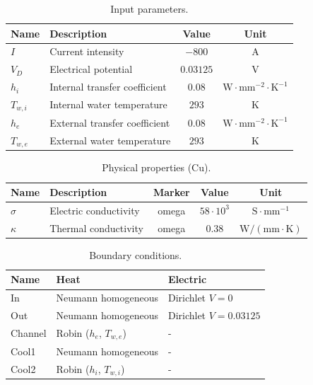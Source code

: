 \documentclass[12pt]{article}
\begin{document}
\begin{table}[H]
	\centering
	\begin{tabular}{|l|l|c|c|}
	\hline
	\textbf{Name} & \textbf{Description} & \textbf{Value} & \textbf{Unit} \\ \hline
	$I$ & Current intensity & $-800$ & A \\ \hline
	$V_D$ & Electrical potential & $0.03125$ & V \\ \hline
	$h_i$ & Internal transfer coefficient & $0.08$ & $\mathrm{W \cdot mm^{-2} \cdot K^{-1}}$ \\ \hline
	$T_{w,i}$ & Internal water temperature & $293$ & K \\ \hline
	$h_e$ & External transfer coefficient & $0.08$ & $\mathrm{W \cdot mm^{-2} \cdot K^{-1}}$ \\ \hline
	$T_{w,e}$ & External water temperature & $293$ & K \\ \hline
	\end{tabular}
	\caption{Input parameters.}
	\label{tab:input_parameters}
	\end{table}

	\begin{table}[H]
		\centering
		\begin{tabular}{|l|l|c|c|c|}
		\hline
		\textbf{Name} & \textbf{Description} & \textbf{Marker} & \textbf{Value} & \textbf{Unit} \\ \hline
		$\sigma$ & Electric conductivity & omega & $58 \cdot 10^3$ & $\mathrm{S \cdot mm^{-1}}$ \\ \hline
		$\kappa$ & Thermal conductivity & omega & $0.38$ & $\mathrm{W/(mm \cdot K)}$ \\ \hline
		\end{tabular}
		\caption{Physical properties (Cu).}
		\label{tab:physical_properties}
	\end{table}

		\begin{table}[H]
			\centering
			\begin{tabular}{|l|l|l|}
			\hline
			\textbf{Name} & \textbf{Heat} & \textbf{Electric} \\ \hline
			In & Neumann homogeneous & Dirichlet $V = 0$ \\ \hline
			Out & Neumann homogeneous & Dirichlet $V = 0.03125$ \\ \hline
			Channel & Robin ($h_e$, $T_{w,e}$) & - \\ \hline
			Cool1 & Neumann homogeneous & - \\ \hline
			Cool2 & Robin ($h_i$, $T_{w,i}$) & - \\ \hline
			\end{tabular}
			\caption{Boundary conditions.}
			\label{tab:boundary_conditions}
		\end{table}
			
\end{document}
